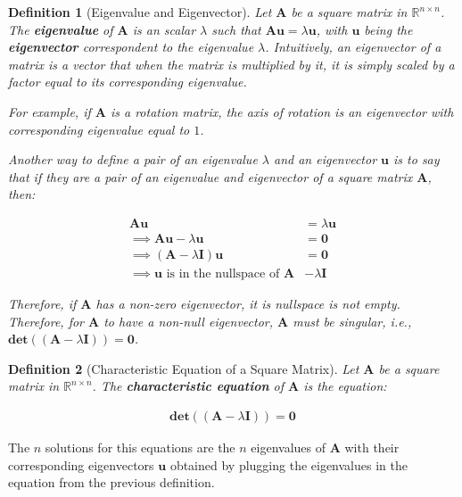 \documentclass{article}
\newtheorem{definition}{Definition}[section]
\begin{document}
\begin{definition}[Eigenvalue and Eigenvector]
	
	Let $\mathbf{A}$ be a square matrix in $\mathbb{R}^{n \times n}$. The \textbf{eigenvalue} of $\mathbf{A}$ is an scalar $\lambda$ such that $\mathbf{Au} = \lambda \mathbf{u}$, with $\mathbf{u}$ being the \textbf{eigenvector} correspondent to the eigenvalue $\lambda$. Intuitively, an eigenvector of a matrix is a vector that when the matrix is multiplied by it, it is simply scaled by a factor equal to its corresponding eigenvalue. 
	
	For example, if $\mathbf{A}$ is a rotation matrix, the axis of rotation is an eigenvector with corresponding eigenvalue equal to $1$.
	
	Another way to define a pair of an eigenvalue $\lambda$ and an eigenvector $\mathbf{u}$ is to say that if they are a pair of an eigenvalue and eigenvector of a square matrix $\mathbf{A}$, then:
	
	\begin{align*}
		\mathbf{Au} &= \lambda \mathbf{u} \\
		\implies \mathbf{Au} - \lambda \mathbf{u} &= \mathbf{0} \\
		\implies (\mathbf{A} - \lambda \mathbf{I})\mathbf{u} &= \mathbf{0} \\
		\implies \mathbf{u}  \text{   is in the nullspace of    }\mathbf{A} &- \lambda \mathbf{I}
	\end{align*}
	
	Therefore, if $\mathbf{A}$ has a non-zero eigenvector, it is nullspace is not empty. Therefore, for $\mathbf{A}$ to have a non-null eigenvector, $\mathbf{A}$ must be singular, i.e.,  $\mathbf{det}((\mathbf{A} - \lambda \mathbf{I})) = \mathbf{0}$.
\end{definition}

\begin{definition}[Characteristic Equation of a Square Matrix]
	
	Let $\mathbf{A}$ be a square matrix in $\mathbb{R}^{n \times n}$. The \textbf{characteristic equation} of $\mathbf{A}$ is the equation:
	
	\begin{align}
		\mathbf{det}((\mathbf{A} - \lambda \mathbf{I})) = \mathbf{0}
	\end{align}
\end{definition}
	The $n$ solutions for this equations are the $n$ eigenvalues of $\mathbf{A}$ with their corresponding eigenvectors $\mathbf{u}$ obtained by plugging the eigenvalues in the equation from the previous definition.
	
\end{document}

